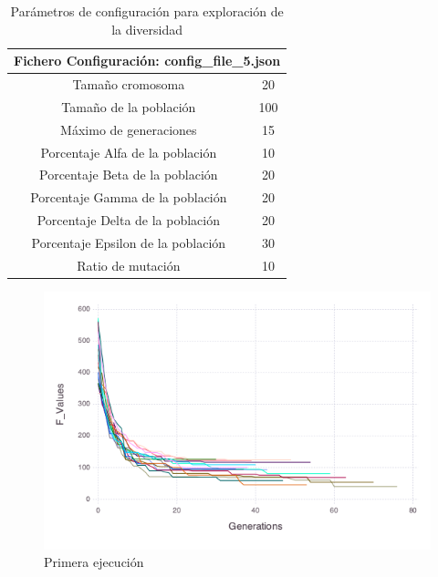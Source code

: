 \begin{table}[]
    \centering
    \begin{tabular}{||c|c||}
        \hline
        \multicolumn{2}{|l|}{\textbf{Fichero Configuración: config\_file\_5.json}} \\ \hline
        Tamaño cromosoma                                & 20               \\ \hline
        Tamaño de la población                          & 100             \\ \hline
        Máximo de generaciones                          & 15              \\ \hline
        Porcentaje Alfa de la población                 & 10              \\ \hline
        Porcentaje Beta de la población                 & 20              \\ \hline
        Porcentaje Gamma de la población                & 20              \\ \hline
        Porcentaje Delta de la población                & 20              \\ \hline
        Porcentaje Epsilon de la población              & 30              \\ \hline
        Ratio de mutación                               & 10              \\ \hline
    \end{tabular}
    \caption{Parámetros de configuración para exploración de la diversidad}
    \label{tab:diversity_config}
\end{table}

\begin{figure}[H]
	\centering	
	\includegraphics[scale=0.6]{figuras/config_file_5_Rastrigin.png}
	\caption{Primera ejecución}
    \label{fig:primera_ejecucion}
\end{figure}

